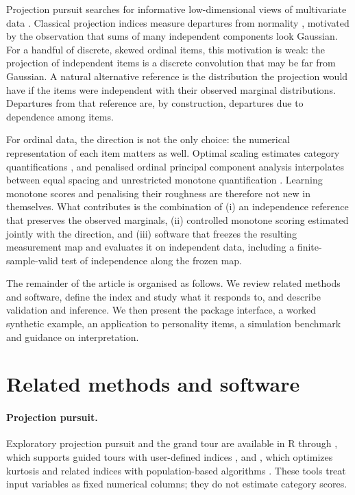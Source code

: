 Projection pursuit searches for informative low-dimensional views of multivariate data \citep{friedman1974,huber1985,jones1987}. Classical projection indices measure departures from normality \citep{friedman1987,hall1989,cook1993}, motivated by the observation that sums of many independent components look Gaussian. For a handful of discrete, skewed ordinal items, this motivation is weak: the projection of independent items is a discrete convolution that may be far from Gaussian. A natural alternative reference is the distribution the projection would have if the items were independent with their observed marginal distributions. Departures from that reference are, by construction, departures due to dependence among items.

For ordinal data, the direction is not the only choice: the numerical representation of each item matters as well. Optimal scaling estimates category quantifications \citep{young1978,gifi1990,linting2007}, and penalised ordinal principal component analysis interpolates between equal spacing and unrestricted monotone quantification \citep{hoshiyar2023}. Learning monotone scores and penalising their roughness are therefore not new in themselves. What  contributes is the combination of (i) an independence reference that preserves the observed marginals, (ii) controlled monotone scoring estimated jointly with the direction, and (iii) software that freezes the resulting measurement map and evaluates it on independent data, including a finite-sample-valid test of independence along the frozen map.

The remainder of the article is organised as follows. We review related methods and software, define the index and study what it responds to, and describe validation and inference. We then present the package interface, a worked synthetic example, an application to personality items, a simulation benchmark and guidance on interpretation.

\section{Related methods and software}
\paragraph{Projection pursuit.} Exploratory projection pursuit and the grand tour \citep{asimov1985} are available in R through , which supports guided tours with user-defined indices \citep{wickham2011,laa2020}, and , which optimizes kurtosis and related indices with population-based algorithms \citep{fischer2021}. These tools treat input variables as fixed numerical columns; they do not estimate category scores.

